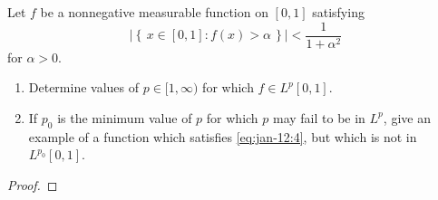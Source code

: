 \begin{problem}
Let $f$ be a nonnegative measurable function on $[0,1]$ satisfying
\begin{equation}
  \label{eq:jan-12:4}
\left|\left\{\,x\in[0,1]:f(x)>\alpha\,\right\}\right|<\frac{1}{1+\alpha^2}
\end{equation}
for $\alpha>0$.
\begin{enumerate}[label=(\alph*),noitemsep]
\item Determine values of $p\in[1,\infty)$ for which $f\in L^p[0,1]$.
\item If $p_0$ is the minimum value of $p$ for which $p$ may fail to be in
  $L^p$, give an example of a function which satisfies \eqref{eq:jan-12:4},
  but which is not in $L^{p_0}[0,1]$.
\end{enumerate}
\end{problem}
\begin{proof}
\end{proof}

